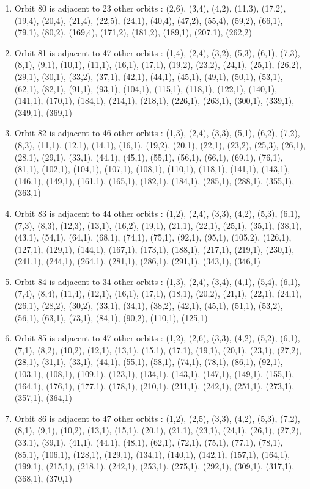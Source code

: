 \documentclass[12pt]{article}
\begin{document}
\begin{enumerate}
\item Orbit 80 is adjacent to 23 other orbits : (2,6), (3,4), (4,2), (11,3), (17,2), (19,4), (20,4), (21,4), (22,5), (24,1), (40,4), (47,2), (55,4), (59,2), (66,1), (79,1), (80,2), (169,4), (171,2), (181,2), (189,1), (207,1), (262,2)
\item Orbit 81 is adjacent to 47 other orbits : (1,4), (2,4), (3,2), (5,3), (6,1), (7,3), (8,1), (9,1), (10,1), (11,1), (16,1), (17,1), (19,2), (23,2), (24,1), (25,1), (26,2), (29,1), (30,1), (33,2), (37,1), (42,1), (44,1), (45,1), (49,1), (50,1), (53,1), (62,1), (82,1), (91,1), (93,1), (104,1), (115,1), (118,1), (122,1), (140,1), (141,1), (170,1), (184,1), (214,1), (218,1), (226,1), (263,1), (300,1), (339,1), (349,1), (369,1)
\item Orbit 82 is adjacent to 46 other orbits : (1,3), (2,4), (3,3), (5,1), (6,2), (7,2), (8,3), (11,1), (12,1), (14,1), (16,1), (19,2), (20,1), (22,1), (23,2), (25,3), (26,1), (28,1), (29,1), (33,1), (44,1), (45,1), (55,1), (56,1), (66,1), (69,1), (76,1), (81,1), (102,1), (104,1), (107,1), (108,1), (110,1), (118,1), (141,1), (143,1), (146,1), (149,1), (161,1), (165,1), (182,1), (184,1), (285,1), (288,1), (355,1), (363,1)
\item Orbit 83 is adjacent to 44 other orbits : (1,2), (2,4), (3,3), (4,2), (5,3), (6,1), (7,3), (8,3), (12,3), (13,1), (16,2), (19,1), (21,1), (22,1), (25,1), (35,1), (38,1), (43,1), (54,1), (64,1), (68,1), (74,1), (75,1), (92,1), (95,1), (105,2), (126,1), (127,1), (129,1), (144,1), (167,1), (173,1), (188,1), (217,1), (219,1), (230,1), (241,1), (244,1), (264,1), (281,1), (286,1), (291,1), (343,1), (346,1)
\item Orbit 84 is adjacent to 34 other orbits : (1,3), (2,4), (3,4), (4,1), (5,4), (6,1), (7,4), (8,4), (11,4), (12,1), (16,1), (17,1), (18,1), (20,2), (21,1), (22,1), (24,1), (26,1), (28,2), (30,2), (33,1), (34,1), (38,2), (42,1), (45,1), (51,1), (53,2), (56,1), (63,1), (73,1), (84,1), (90,2), (110,1), (125,1)
\item Orbit 85 is adjacent to 47 other orbits : (1,2), (2,6), (3,3), (4,2), (5,2), (6,1), (7,1), (8,2), (10,2), (12,1), (13,1), (15,1), (17,1), (19,1), (20,1), (23,1), (27,2), (28,1), (31,1), (33,1), (44,1), (55,1), (58,1), (74,1), (78,1), (86,1), (92,1), (103,1), (108,1), (109,1), (123,1), (134,1), (143,1), (147,1), (149,1), (155,1), (164,1), (176,1), (177,1), (178,1), (210,1), (211,1), (242,1), (251,1), (273,1), (357,1), (364,1)
\item Orbit 86 is adjacent to 47 other orbits : (1,2), (2,5), (3,3), (4,2), (5,3), (7,2), (8,1), (9,1), (10,2), (13,1), (15,1), (20,1), (21,1), (23,1), (24,1), (26,1), (27,2), (33,1), (39,1), (41,1), (44,1), (48,1), (62,1), (72,1), (75,1), (77,1), (78,1), (85,1), (106,1), (128,1), (129,1), (134,1), (140,1), (142,1), (157,1), (164,1), (199,1), (215,1), (218,1), (242,1), (253,1), (275,1), (292,1), (309,1), (317,1), (368,1), (370,1)

\end{enumerate}
\end{document}
